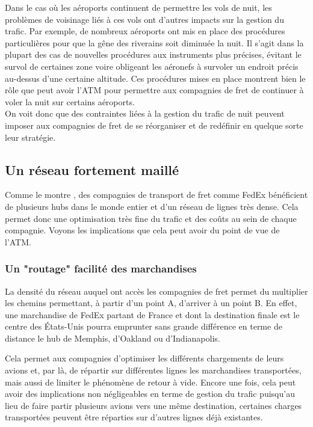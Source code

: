 Dans le cas où les aéroports continuent de permettre les vols de nuit, les problèmes de voisinage liés à ces vols ont d'autres impacts sur la gestion du trafic. Par exemple, de nombreux aéroports ont mis en place des procédures particulières pour que la gêne des riverains soit diminuée la nuit. Il s'agit dans la plupart des cas de nouvelles procédures aux instruments plus précises, évitant le survol de certaines zone voire obligeant les aéronefs à survoler un endroit précis au-dessus d'une certaine altitude. Ces procédures mises en place montrent bien le rôle que peut avoir l'ATM pour permettre aux compagnies de fret de continuer à voler la nuit sur certains aéroports.\\

On voit donc que des contraintes liées à la gestion du trafic de nuit peuvent imposer aux compagnies de fret de se réorganiser et de redéfinir en quelque sorte leur stratégie.

\subsection{Un réseau fortement maillé}

Comme le montre \cite{O'Kelly20141}, des compagnies de transport de fret comme FedEx bénéficient de plusieurs hubs dans le monde entier et d'un réseau de lignes très dense. Cela permet donc une optimisation très fine  du trafic et des coûts au sein de chaque compagnie. Voyons les implications que cela peut avoir du point de vue de l'ATM.

\subsubsection{Un "routage" facilité des marchandises}

La densité du réseau auquel ont accès les compagnies de fret permet du multiplier les chemins permettant, à partir d'un point A, d'arriver à un point B. En effet, une marchandise de FedEx partant de France et dont la destination finale est le centre des États-Unis pourra emprunter sans grande différence en terme de distance le hub de Memphis, d'Oakland ou d'Indianapolis.

Cela permet aux compagnies d'optimiser les différents chargements de leurs avions et, par là, de répartir sur différentes lignes les marchandises transportées, mais aussi de limiter le phénomène de retour à vide. Encore une fois, cela peut avoir des implications non négligeables en terme de gestion du trafic puisqu'au lieu de faire partir plusieurs avions vers une même destination, certaines charges transportées peuvent être réparties sur d'autres lignes déjà existantes.

